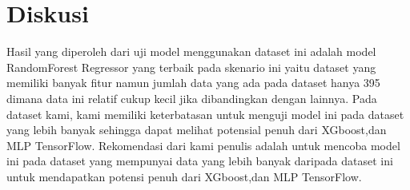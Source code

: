 \chapter*{Diskusi}

Hasil yang diperoleh dari uji model menggunakan dataset ini adalah model RandomForest Regressor yang terbaik pada skenario ini yaitu dataset 
yang memiliki banyak fitur namun jumlah data yang ada pada dataset hanya 395 dimana data ini relatif cukup kecil jika dibandingkan dengan lainnya.
Pada dataset kami, kami memiliki keterbatasan untuk menguji model ini pada dataset yang lebih banyak sehingga dapat melihat potensial penuh dari 
XGboost,dan MLP TensorFlow. Rekomendasi dari kami penulis adalah untuk mencoba model ini pada dataset yang mempunyai data yang lebih banyak daripada 
dataset ini untuk mendapatkan potensi penuh dari XGboost,dan MLP TensorFlow.